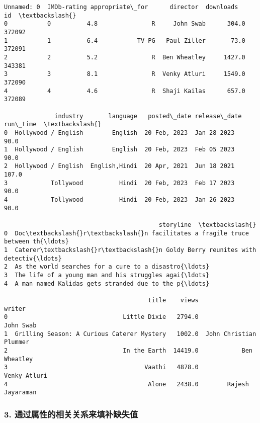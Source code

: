 \documentclass[11pt]{article}
\makeatletter
\newcommand{\boxspacing}{\kern\kvtcb@left@rule\kern\kvtcb@boxsep}
\newcommand{\prompt}[4]{
        {\ttfamily\llap{{\color{#2}[#3]:\hspace{3pt}#4}}\vspace{-\baselineskip}}
    }
\makeatother
\begin{document}
            \begin{tcolorbox}[breakable, size=fbox, boxrule=.5pt, pad at break*=1mm, opacityfill=0]
\prompt{Out}{outcolor}{38}{\boxspacing}
\begin{Verbatim}[commandchars=\\\{\}]
   Unnamed: 0  IMDb-rating appropriate\_for      director  downloads      id  \textbackslash{}
0           0          4.8               R     John Swab      304.0  372092
1           1          6.4           TV-PG   Paul Ziller       73.0  372091
2           2          5.2               R  Ben Wheatley     1427.0  343381
3           3          8.1               R  Venky Atluri     1549.0  372090
4           4          4.6               R  Shaji Kailas      657.0  372089

              industry       language   posted\_date release\_date  run\_time  \textbackslash{}
0  Hollywood / English        English  20 Feb, 2023  Jan 28 2023      90.0
1  Hollywood / English        English  20 Feb, 2023  Feb 05 2023      90.0
2  Hollywood / English  English,Hindi  20 Apr, 2021  Jun 18 2021     107.0
3            Tollywood          Hindi  20 Feb, 2023  Feb 17 2023      90.0
4            Tollywood          Hindi  20 Feb, 2023  Jan 26 2023      90.0

                                           storyline  \textbackslash{}
0  Doc\textbackslash{}r\textbackslash{}n facilitates a fragile truce between th{\ldots}
1  Caterer\textbackslash{}r\textbackslash{}n Goldy Berry reunites with detectiv{\ldots}
2  As the world searches for a cure to a disastro{\ldots}
3  The life of a young man and his struggles agai{\ldots}
4  A man named Kalidas gets stranded due to the p{\ldots}

                                        title    views                  writer
0                                Little Dixie   2794.0               John Swab
1  Grilling Season: A Curious Caterer Mystery   1002.0  John Christian Plummer
2                                In the Earth  14419.0            Ben Wheatley
3                                      Vaathi   4878.0            Venky Atluri
4                                       Alone   2438.0        Rajesh Jayaraman
\end{Verbatim}
\end{tcolorbox}
        
    \subsubsection{3.
通过属性的相关关系来填补缺失值}\label{ux901aux8fc7ux5c5eux6027ux7684ux76f8ux5173ux5173ux7cfbux6765ux586bux8865ux7f3aux5931ux503c}
\end{document}
